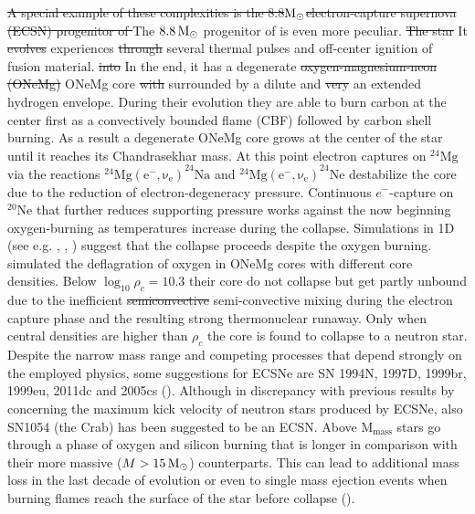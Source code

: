 \documentclass[fleqn,usenatbib]{mnras}
\newcommand{\solm}{\xspace\ensuremath{\rm{M_{\odot}}}}
\newcommand{\NY}[2]{{\color{blue}\sout{#1}#2}}
\begin{document}
\NY{A special example of these complexities is the 8.8\solm electron-capture supernova (ECSN) progenitor of \cite{Nomoto1984}}{ The $8.8\, \solm$ progenitor of \cite{Nomoto1984} is even more peculiar}. \NY{The star}{ It} \NY{evolves}{ experiences} \NY{through}{} several thermal pulses and off-center ignition of fusion material\NY{}{.} \NY{into}{ In the end, it has} a degenerate \NY{oxygen-magnesium-neon (ONeMg)}{ ONeMg} core \NY{with}{ surrounded by} a dilute and \NY{very}{ an} extended hydrogen envelope.
During their evolution they are able to burn carbon at the center first as a convectively bounded flame (CBF) followed by carbon shell burning. As a result a degenerate ONeMg core grows at the center of the star until it reaches its Chandrasekhar mass. At this point electron captures on $\mathrm{^{24}Mg}$ via the reactions $\mathrm{^{24}Mg(e^-,\nu_e)}^{24}\mathrm{Na}$  and $\mathrm{^{24}Mg(e^-,\nu_e)}^{24}\mathrm{Ne}$ destabilize the core due to the reduction of electron-degeneracy pressure. Continuous $e^-$-capture on $\mathrm{^{20}Ne}$ that further reduces supporting pressure works against the now beginning oxygen-burning as temperatures increase during the collapse. Simulations in 1D (see e.g. \cite{NihonTenmonGakkai.1949PublicationsJapan.}, \cite{Janka2008}, \cite{Kitaura2006}) suggest that the collapse proceeds despite the oxygen burning. \cite{Jones2016} simulated the deflagration of oxygen in ONeMg cores with different core densities. Below $\log_{10}\rho_c=10.3$ their core do not collapse but get partly unbound due to the inefficient \NY{semiconvective}{ semi-convective} mixing during the electron capture phase and the resulting strong thermonuclear runaway. Only when central densities are higher than $\rho_c$ the core is found to collapse to a neutron star.
Despite the narrow mass range and competing processes that depend strongly on the employed physics, some suggestions for ECSNe  are SN 1994N, 1997D, 1999br, 1999eu, 2011dc and 2005cs (\cite{StevensonExtremeBlasts}). Although in discrepancy with previous results by \cite{Gessner2018HydrodynamicalSupernova} concerning the maximum kick velocity of neutron stars produced by ECSNe, also SN1054 (the Crab) has been suggested to be an ECSN.
Above $\mathrm{M_{mass}}$ stars go through a phase of oxygen and silicon burning that is longer in comparison with their more massive ($M > 15\, \solm$) counterparts.  This can lead to additional mass loss in the last decade of evolution or even to single mass ejection events when burning flames reach the surface of the star before collapse (\cite{Woosley2015}).
\end{document}
